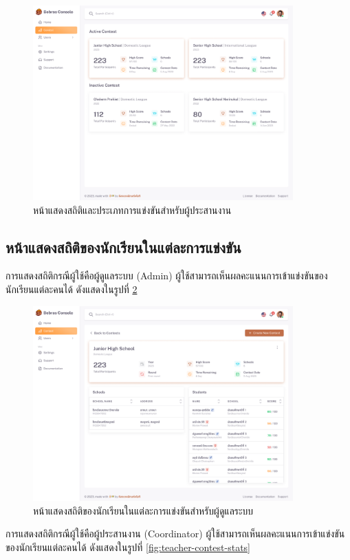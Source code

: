 \begin{figure}[H]
    \centering
    \includegraphics[width=100mm,scale=1.0]{images/teacher-contest-dashboard.png}
    \caption{หน้าแสดงสถิติและประเภทการแข่งขันสำหรับผู้ประสานงาน}
    \label{fig:teacher-contest-dashboard}
\end{figure}

\subsection{หน้าแสดงสถิติของนักเรียนในแต่ละการแข่งขัน}

การแสดงสถิติกรณีผู้ใช้คือผู้ดูแลระบบ (Admin) ผู้ใช้สามารถเห็นผลคะแนนการเข้าแข่งขันของนักเรียนแต่ละคนได้ ดังแสดงในรูปที่ \ref{fig:admin-contest-stats}

\begin{figure}[H]
    \centering
    \includegraphics[width=100mm,scale=1.0]{images/admin-contest-stats.png}
    \caption{หน้าแสดงสถิติของนักเรียนในแต่ละการแข่งขันสำหรับผู้ดูแลระบบ}
    \label{fig:admin-contest-stats}
\end{figure}

การแสดงสถิติกรณีผู้ใช้คือผู้ประสานงาน (Coordinator) ผู้ใช้สามารถเห็นผลคะแนนการเข้าแข่งขันของนักเรียนแต่ละคนได้ ดังแสดงในรูปที่ \ref{fig:teacher-contest-stats}

